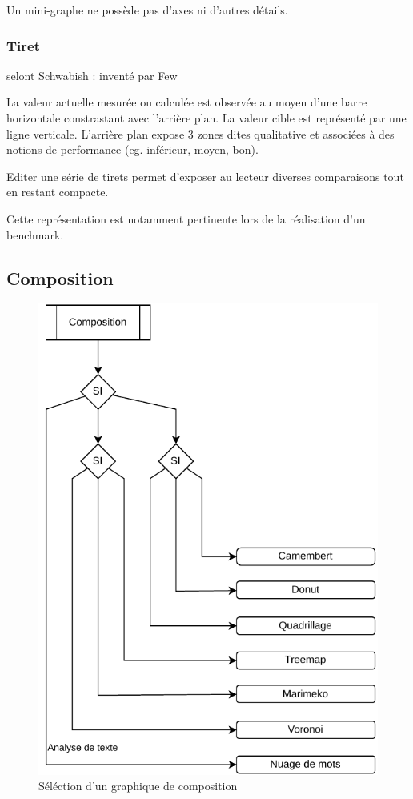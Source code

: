 \documentclass[a4paper,12pt]{article}
\begin{document}
\begin{multicols}{2}
Un mini-graphe ne possède pas d'axes ni d'autres détails.
\subsubsection*{Tiret}
\label{sec:orge7b1993}
selont Schwabish : inventé par Few

La valeur actuelle mesurée ou calculée est observée au moyen d'une barre horizontale constrastant avec l'arrière plan. \autocite{jonathanschwabishComparingCategories2021}
La valeur cible est représenté par une ligne verticale. \autocite{alansmithLexiqueVisuel}
L'arrière plan expose 3 zones dites qualitative et associées à des notions de performance (eg. inférieur, moyen, bon). \autocite{sosulskiGraphics2019}

Editer une série de tirets permet d'exposer au lecteur diverses comparaisons tout en restant compacte. \autocite{jonathanschwabishComparingCategories2021}

Cette représentation est notamment pertinente lors de la réalisation d'un benchmark. \autocite{mikeyiHowChooseRight2020}
\subsection*{Composition}
\label{sec:orga567e36}

\begin{figure}[H]
\centering
\includegraphics[width=.9\linewidth]{./img/select-composition.pdf}
\caption{\label{fig:org30f65cc}Séléction d'un graphique de composition}
\end{figure}

\end{multicols}
\end{document}
